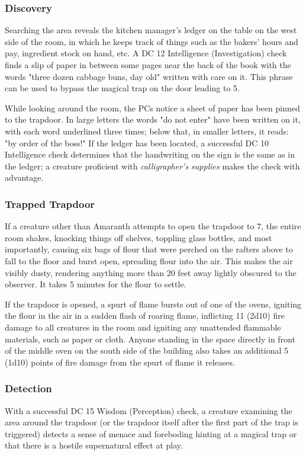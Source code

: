 \documentclass[10pt,a4paper,twoside,bg=print,twocolumn,openany,nodeprecatedcode]{dndbook}
\begin{document}
\subsubsection{Discovery}
Searching the area reveals the kitchen manager's ledger on the table on the west side of the room, in which he keeps track of things such as the bakers' hours and pay, ingredient stock on hand, etc. A DC 12 Intelligence (Investigation) check finds a slip of paper in between some pages near the back of the book with the words "three dozen cabbage buns, day old" written with care on it. This phrase can be used to bypass the magical trap on the door leading to 5.

While looking around the room, the PCs notice a sheet of paper has been pinned to the trapdoor. In large letters the words "do not enter" have been written on it, with each word underlined three times; below that, in smaller letters, it reads: "by order of the boss!" If the ledger has been located, a successful DC 10 Intelligence check determines that the handwriting on the sign is the same as in the ledger; a creature proficient with \textit{calligrapher's supplies} makes the check with advantage.

\subsubsection{Trapped Trapdoor}
If a creature other than Amaranth attempts to open the trapdoor to 7, the entire room shakes, knocking things off shelves, toppling glass bottles, and most importantly, causing six bags of flour that were perched on the rafters above to fall to the floor and burst open, spreading flour into the air. This makes the air visibly dusty, rendering anything more than 20 feet away lightly obscured to the observer. It takes 5 minutes for the flour to settle.

If the trapdoor is opened, a spurt of flame bursts out of one of the ovens, igniting the flour in the air in a sudden flash of roaring flame, inflicting 11 (2d10) fire damage to all creatures in the room and igniting any unattended flammable materials, such as paper or cloth. Anyone standing in the space directly in front of the middle oven on the south side of the building also takes an additional 5 (1d10) points of fire damage from the spurt of flame it releases.

\subsubsection{Detection}
With a successful DC 15 Wisdom (Perception) check, a creature examining the area around the trapdoor (or the trapdoor itself after the first part of the trap is triggered) detects a sense of menace and foreboding hinting at a magical trap or that there is a hostile supernatural effect at play.
\end{document}
